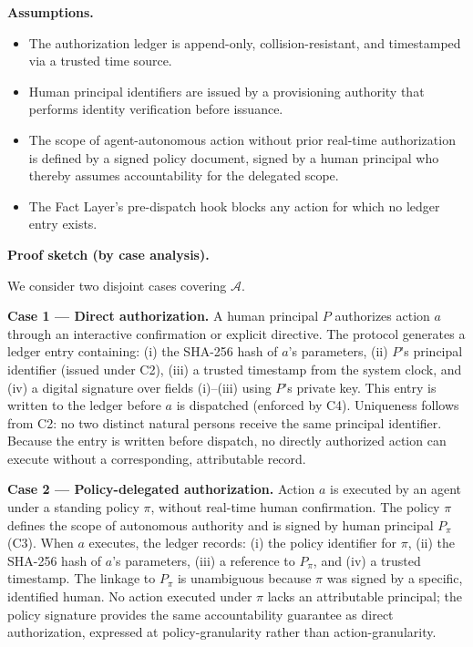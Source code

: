 \medskip\noindent\textbf{Assumptions.}
\begin{itemize}\itemsep0em
    \item[(C1)] The authorization ledger is append-only, collision-resistant, and timestamped via a trusted time source.
    \item[(C2)] Human principal identifiers are issued by a provisioning authority that performs identity verification before issuance.
    \item[(C3)] The scope of agent-autonomous action without prior real-time authorization is defined by a signed policy document, signed by a human principal who thereby assumes accountability for the delegated scope.
    \item[(C4)] The Fact Layer's pre-dispatch hook blocks any action for which no ledger entry exists.
\end{itemize}

\medskip\noindent\textbf{Proof sketch (by case analysis).}

We consider two disjoint cases covering $\mathcal{A}$.

\textbf{Case 1 — Direct authorization.} A human principal $P$ authorizes action $a$ through an interactive confirmation or explicit directive. The protocol generates a ledger entry containing: (i) the SHA-256 hash of $a$'s parameters, (ii) $P$'s principal identifier (issued under C2), (iii) a trusted timestamp from the system clock, and (iv) a digital signature over fields (i)–(iii) using $P$'s private key. This entry is written to the ledger before $a$ is dispatched (enforced by C4). Uniqueness follows from C2: no two distinct natural persons receive the same principal identifier. Because the entry is written before dispatch, no directly authorized action can execute without a corresponding, attributable record.

\textbf{Case 2 — Policy-delegated authorization.} Action $a$ is executed by an agent under a standing policy $\pi$, without real-time human confirmation. The policy $\pi$ defines the scope of autonomous authority and is signed by human principal $P_\pi$ (C3). When $a$ executes, the ledger records: (i) the policy identifier for $\pi$, (ii) the SHA-256 hash of $a$'s parameters, (iii) a reference to $P_\pi$, and (iv) a trusted timestamp. The linkage to $P_\pi$ is unambiguous because $\pi$ was signed by a specific, identified human. No action executed under $\pi$ lacks an attributable principal; the policy signature provides the same accountability guarantee as direct authorization, expressed at policy-granularity rather than action-granularity.

